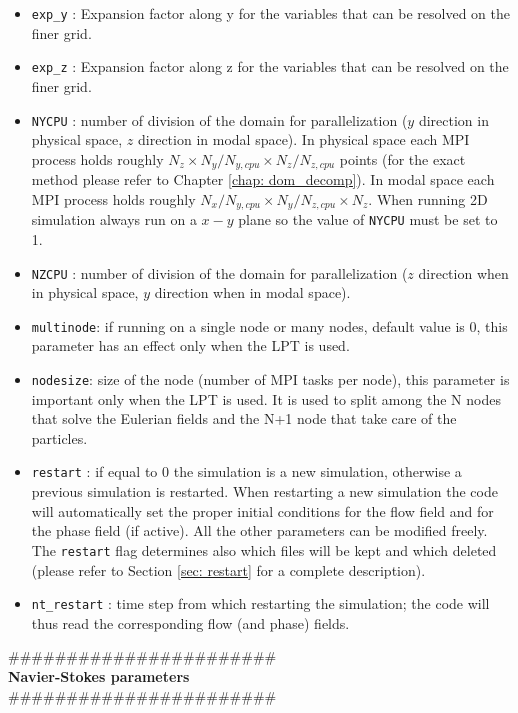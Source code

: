 \begin{itemize}
\item \texttt{exp\_y} : Expansion factor along y for the variables that can be resolved on the finer grid.
\item \texttt{exp\_z} : Expansion factor along z for the variables that can be resolved on the finer grid.
\item \texttt{NYCPU} : number of division of the domain for parallelization ($y$ direction in physical space, $z$ direction in modal space). In physical space each MPI process holds roughly $N_z\times N_y/N_{y,cpu} \times N_z/N_{z,cpu}$ points (for the exact method please refer to Chapter \ref{chap: dom_decomp}). In modal space each MPI process holds roughly $N_x/N_{y,cpu}\times N_y/N_{z,cpu}\times N_z$. When running 2D simulation always run on a $x-y$ plane so the value of \texttt{NYCPU} must be set to 1.
\item \texttt{NZCPU} : number of division of the domain for parallelization ($z$ direction when in physical space, $y$ direction when in modal space).
\item \texttt{multinode}: if running on a single node or many nodes, default value is 0, this parameter has an effect only when the LPT is used.
\item \texttt{nodesize}: size of the node (number of MPI tasks per node), this parameter is important only when the LPT is used. It is used to split among the N nodes that solve the Eulerian fields and the N+1 node that take care of the particles.
\item \texttt{restart} : if equal to 0 the simulation is a new simulation, otherwise a previous simulation is restarted. When restarting a new simulation the code will automatically set the proper initial conditions for the flow field and for the phase field (if active). All the other parameters can be modified freely. The \texttt{restart} flag determines also which files will be kept and which deleted (please refer to Section \ref{sec: restart} for a complete description).
\item \texttt{nt\_restart} : time step from which restarting the simulation; the code will thus read the corresponding flow (and phase) fields.
\end{itemize}
\#\#\#\#\#\#\#\#\#\#\#\#\#\#\#\#\#\#\#\#\#\#\#\\
{\bf Navier-Stokes parameters}\\
\#\#\#\#\#\#\#\#\#\#\#\#\#\#\#\#\#\#\#\#\#\#\#
